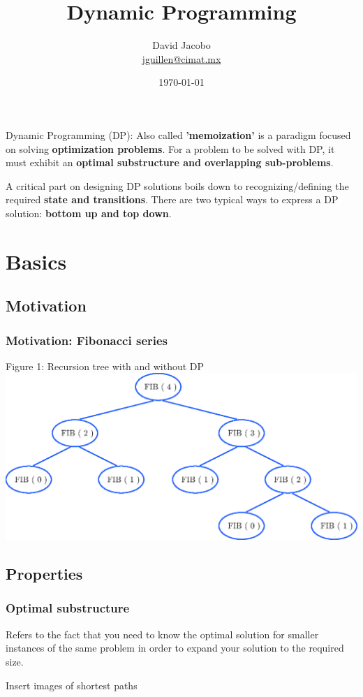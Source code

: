 \documentclass[article]{beamer}
\title{Dynamic Programming}
\author{David Jacobo \\ \href{mailto:jguillen@cimat.mx}{jguillen@cimat.mx}}
\date{\scriptsize{\today}}
\begin{document}
\maketitle

\begin{frame}
\begin{block}{Dynamic Programming (DP):}
	Also called \textbf{'memoization'} is a paradigm focused on solving \textbf{optimization 
	problems}. For a problem to be solved with DP, it must exhibit an \textbf{optimal substructure and
	overlapping sub-problems}.
	
	\vspace{8mm}
	
	A critical part on designing DP solutions boils down to recognizing/defining the 
	required \textbf{state and transitions}. There are two typical ways to express a DP solution: \textbf{bottom up and top down}.
\end{block}
\end{frame}


\section{Basics}

\subsection{Motivation}
\begin{frame}
	\frametitle{Motivation: Fibonacci series}
	Figure 1: Recursion tree with and without DP
	\includegraphics[scale=0.5]{./figures/fib.eps}
\end{frame}

\subsection{Properties}
\begin{frame}
	\frametitle{Optimal substructure}
	Refers to the fact that you need to know the optimal solution for smaller instances of the same problem in order to expand your solution to the required size.
	
	\vspace{8mm}
	
	Insert images of shortest paths	
\end{frame}
\end{document}
